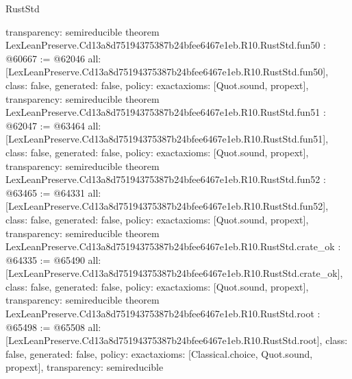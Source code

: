 \begin{lexlean}{RustStd}
\begin{coremodule}
{  transparency: semireducible
}
theorem LexLeanPreserve.Cd13a8d75194375387b24bfee6467e1eb.R10.RustStd.fun50 : @60667 := @62046 {
  all: [LexLeanPreserve.Cd13a8d75194375387b24bfee6467e1eb.R10.RustStd.fun50],
  class: false,
  generated: false,
  policy: exact{axioms: [Quot.sound, propext]},
  transparency: semireducible
}
theorem LexLeanPreserve.Cd13a8d75194375387b24bfee6467e1eb.R10.RustStd.fun51 : @62047 := @63464 {
  all: [LexLeanPreserve.Cd13a8d75194375387b24bfee6467e1eb.R10.RustStd.fun51],
  class: false,
  generated: false,
  policy: exact{axioms: [Quot.sound, propext]},
  transparency: semireducible
}
theorem LexLeanPreserve.Cd13a8d75194375387b24bfee6467e1eb.R10.RustStd.fun52 : @63465 := @64331 {
  all: [LexLeanPreserve.Cd13a8d75194375387b24bfee6467e1eb.R10.RustStd.fun52],
  class: false,
  generated: false,
  policy: exact{axioms: [Quot.sound, propext]},
  transparency: semireducible
}
theorem LexLeanPreserve.Cd13a8d75194375387b24bfee6467e1eb.R10.RustStd.crate_ok : @64335 := @65490 {
  all: [LexLeanPreserve.Cd13a8d75194375387b24bfee6467e1eb.R10.RustStd.crate_ok],
  class: false,
  generated: false,
  policy: exact{axioms: [Quot.sound, propext]},
  transparency: semireducible
}
theorem LexLeanPreserve.Cd13a8d75194375387b24bfee6467e1eb.R10.RustStd.root : @65498 := @65508 {
  all: [LexLeanPreserve.Cd13a8d75194375387b24bfee6467e1eb.R10.RustStd.root],
  class: false,
  generated: false,
  policy: exact{axioms: [Classical.choice, Quot.sound, propext]},
  transparency: semireducible
}


\end{coremodule}
\end{lexlean}
